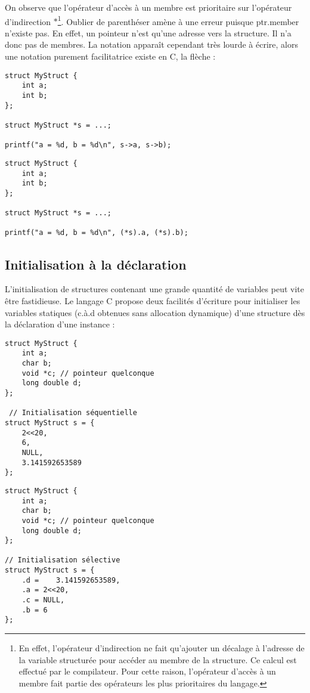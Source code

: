 \documentclass[../../../main.tex]{subfiles}
\begin{document}
On observe que l'opérateur d'accès à un membre est prioritaire sur l'opérateur d'indirection $*$\footnote{En effet, l'opérateur d'indirection ne fait qu'ajouter un décalage à l'adresse de la variable structurée pour accéder au membre de la structure. Ce calcul est effectué par le compilateur. Pour cette raison, l'opérateur d'accès à un membre fait partie des opérateurs les plus prioritaires du langage.}. Oublier de parenthéser amène à une erreur puisque \textsf{ptr.member} n'existe pas. En effet, un pointeur n'est qu'une adresse vers la structure. Il n'a donc pas de membres. \newline
La notation apparaît cependant très lourde à écrire, alors une notation purement facilitatrice existe en C, la flèche :
 
\begin{minipage}{0.5\textwidth}
\begin{verbatim}
struct MyStruct {
	int a;
	int b;
};

struct MyStruct *s = ...;

printf("a = %d, b = %d\n", s->a, s->b);
\end{verbatim}
\end{minipage}
\begin{minipage}{0.5\textwidth}
\begin{verbatim}
struct MyStruct {
	int a;
	int b;
};

struct MyStruct *s = ...;

printf("a = %d, b = %d\n", (*s).a, (*s).b);
\end{verbatim}
\end{minipage}
\subsection{Initialisation à la déclaration}
L'initialisation de structures contenant une grande quantité de variables peut vite être fastidieuse. Le langage C propose deux facilités d'écriture pour initialiser les variables statiques (c.à.d obtenues sans allocation dynamique) d'une structure dès la déclaration d'une instance : 

\begin{minipage}{0.5\textwidth}
\begin{verbatim}
struct MyStruct {
	int a;
	char b;
	void *c; // pointeur quelconque
	long double d; 
};

 // Initialisation séquentielle
struct MyStruct s = {
	2<<20,
	6,
	NULL,
	3.141592653589
};
\end{verbatim}
\end{minipage}
\begin{minipage}{0.5\textwidth}
\begin{verbatim}
struct MyStruct {
	int a;
	char b;
	void *c; // pointeur quelconque
	long double d;
};

// Initialisation sélective
struct MyStruct s = {
	.d =	3.141592653589,
	.a = 2<<20,
	.c = NULL,
	.b = 6
}; 
\end{verbatim}
\end{minipage}
\end{document}
